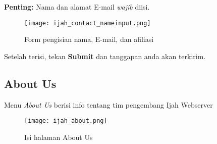 \textbf{Penting:} Nama dan alamat E-mail \emph{wajib} diisi. 

\begin{figure}[H]
	\centering
	\texttt{[image: ijah\_contact\_nameinput.png]}
	\caption{Form pengisian nama, E-mail, dan afiliasi}
	\label{fig:ijah_contact_nameinput}
\end{figure}

Setelah terisi, tekan \textbf{Submit} dan tanggapan anda akan terkirim.

\subsection{About Us}

Menu \emph{About Us} berisi info tentang tim pengembang Ijah Webserver

\begin{figure}[H]
	\centering
	\texttt{[image: ijah\_about.png]}
	\caption{Isi halaman About Us}
	\label{fig:ijah_about}
\end{figure}